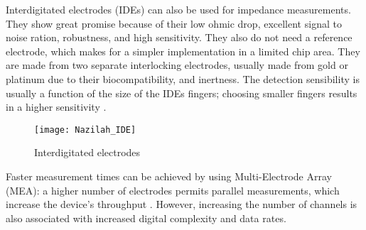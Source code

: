 Interdigitated electrodes (IDEs) can also be used for impedance measurements. They show great promise because of their low ohmic drop, excellent signal to noise ration, robustness, and high sensitivity. They also do not need a reference electrode, which makes for a simpler implementation in a limited chip area. They are made from two separate interlocking electrodes, usually made from gold or platinum due to their biocompatibility, and inertness. The detection sensibility is usually a function of the size of the IDEs fingers; choosing smaller fingers results in a higher sensitivity \cite{Khormazard2016}.  \par
\begin{figure}[h]
    \centering
    \texttt{[image: Nazilah\_IDE]}
    \caption{Interdigitated electrodes \citep{hosseini2021optimization}}
    \label{fig:Nazilah_IDE}
\end{figure}

Faster measurement times can be achieved by using Multi-Electrode Array (MEA): a higher number of electrodes permits parallel measurements, which increase the device’s throughput \cite{Rajabzadeh2019EIS}. However, increasing the number of channels is also associated with increased digital complexity and data rates.
